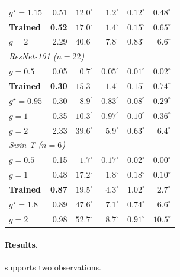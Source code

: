 \begin{table}[t]
\begin{tabular}{lrrrrr}
        $g^\star{=}1.15$ & 0.51 & $12.0^\circ$ & $1.2^\circ$ & $0.12^\circ$ & $0.48^\circ$ \\
        \textbf{Trained} & \textbf{0.52} & $\mathbf{17.0^\circ}$ & $\mathbf{1.4^\circ}$ & $\mathbf{0.15^\circ}$ & $\mathbf{0.65^\circ}$ \\
        $g{=}2$    & 2.29 & $40.6^\circ$ & $7.8^\circ$  & $0.83^\circ$ & $6.6^\circ$ \\
        \midrule
        \multicolumn{6}{l}{\emph{ResNet-101 ($n{=}22$)}} \\
        $g{=}0.5$  & 0.05 & $0.7^\circ$  & $0.05^\circ$ & $0.01^\circ$ & $0.02^\circ$ \\
        \textbf{Trained} & \textbf{0.30} & $\mathbf{15.3^\circ}$ & $\mathbf{1.4^\circ}$ & $\mathbf{0.15^\circ}$ & $\mathbf{0.74^\circ}$ \\
        $g^\star{=}0.95$ & 0.30 & $8.9^\circ$ & $0.83^\circ$ & $0.08^\circ$ & $0.29^\circ$ \\
        $g{=}1$    & 0.35 & $10.3^\circ$ & $0.97^\circ$ & $0.10^\circ$ & $0.36^\circ$ \\
        $g{=}2$    & 2.33 & $39.6^\circ$ & $5.9^\circ$  & $0.63^\circ$ & $6.4^\circ$ \\
        \midrule
        \multicolumn{6}{l}{\emph{Swin-T ($n{=}6$)}} \\
        $g{=}0.5$  & 0.15 & $1.7^\circ$  & $0.17^\circ$ & $0.02^\circ$ & $0.00^\circ$ \\
        $g{=}1$    & 0.48 & $17.2^\circ$ & $1.8^\circ$  & $0.18^\circ$ & $0.10^\circ$ \\
        \textbf{Trained} & \textbf{0.87} & $\mathbf{19.5^\circ}$ & $\mathbf{4.3^\circ}$ & $\mathbf{1.02^\circ}$ & $\mathbf{2.7^\circ}$ \\
        $g^\star{=}1.8$ & 0.89 & $47.6^\circ$ & $7.1^\circ$ & $0.74^\circ$ & $6.6^\circ$ \\
        $g{=}2$    & 0.98 & $52.7^\circ$ & $8.7^\circ$  & $0.91^\circ$ & $10.5^\circ$ \\
        \bottomrule
    \end{tabular}
\end{table}

\paragraph{Results.}
 supports two observations.

